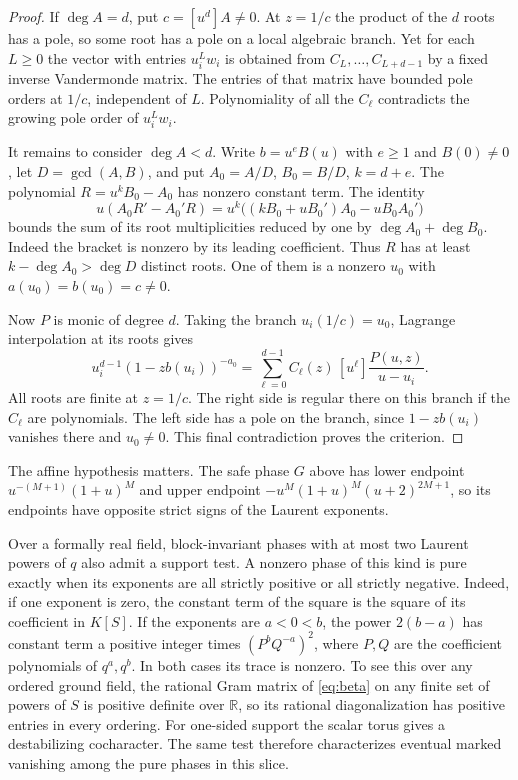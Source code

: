 \documentclass[11pt]{article}
\begin{document}
\begin{proof}
If \(\deg A=d\), put \(c=[u^d]A\ne0\).
At \(z=1/c\) the product of the \(d\) roots has a pole,
so some root has a pole on a local algebraic branch.
Yet for each \(L\ge0\) the vector with entries \(u_i^L w_i\)
is obtained from \(C_L,\ldots,C_{L+d-1}\) by a fixed
inverse Vandermonde matrix. The entries of that matrix have
bounded pole orders at \(1/c\), independent of \(L\).
Polynomiality of all the \(C_\ell\) contradicts the growing
pole order of \(u_i^Lw_i\).

It remains to consider \(\deg A<d\).
Write \(b=u^eB(u)\) with \(e\ge1\) and \(B(0)\ne0\),
let \(D=\gcd(A,B)\), and put \(A_0=A/D\), \(B_0=B/D\),
\(k=d+e\). The polynomial \(R=u^kB_0-A_0\) has nonzero
constant term. The identity
\[
 u(A_0R'-A_0'R)=u^k\bigl((kB_0+uB_0')A_0-uB_0 A_0'\bigr)
\]
bounds the sum of its root multiplicities reduced by one
by \(\deg A_0+\deg B_0\). Indeed the bracket is nonzero by its
leading coefficient. Thus \(R\) has at least
\(k-\deg A_0>\deg D\) distinct roots.
One of them is a nonzero \(u_0\) with \(a(u_0)=b(u_0)=c\ne0\).

Now \(P\) is monic of degree \(d\). Taking the branch
\(u_i(1/c)=u_0\), Lagrange interpolation at its roots gives
\[
 u_i^{d-1}(1-zb(u_i))^{-a_0}
       =\sum_{\ell=0}^{d-1} C_\ell(z)\,
              [u^\ell]\frac{P(u,z)}{u-u_i}.
\]
All roots are finite at \(z=1/c\). The right side is regular
there on this branch if the \(C_\ell\) are polynomials.
The left side has a pole on the branch, since
\(1-zb(u_i)\) vanishes there and \(u_0\ne0\).
This final contradiction proves the criterion.
\end{proof}

The affine hypothesis matters. The safe phase \(G\) above has
lower endpoint \(u^{-(M+1)}(1+u)^M\) and upper endpoint
\(-u^M(1+u)^M(u+2)^{2M+1}\), so its endpoints have opposite
strict signs of the Laurent exponents.

Over a formally real field, block-invariant phases with at most two
Laurent powers of \(q\) also admit a support test. A nonzero phase of this kind
is pure exactly when its exponents are all strictly positive or
all strictly negative. Indeed, if one exponent is zero, the
constant term of the square is the square of its coefficient
in \(K[S]\). If the exponents are \(a<0<b\), the power
\(2(b-a)\) has constant term a positive integer times \((P^b Q^{-a})^2\), where \(P,Q\)
are the coefficient polynomials of \(q^a,q^b\). In both cases its trace is
nonzero. To see this over any ordered ground field, the rational
Gram matrix of \eqref{eq:beta} on any finite set of powers of \(S\)
is positive definite over \(\mathbb R\), so its rational
diagonalization has positive entries in every ordering.
For one-sided support the scalar torus gives a destabilizing
cocharacter. The same test therefore characterizes eventual
marked vanishing among the pure phases in this slice.
\end{document}
